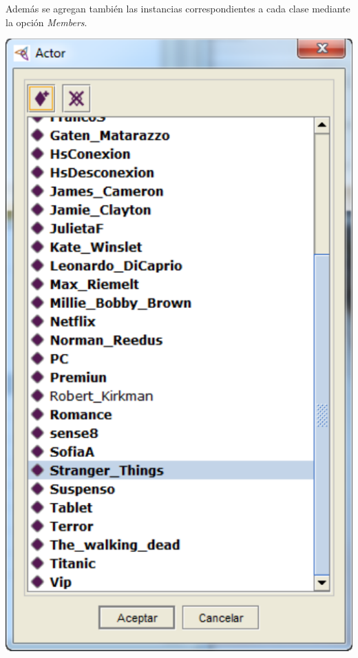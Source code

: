 \documentclass[a4paper,10pt,spanish,oneside]{article}
\begin{document}
\begin{minipage}{0.3\linewidth}

Además se agregan también las instancias correspondientes a cada clase mediante la opción \textit{Members}.

\end{minipage} \hfill \begin{minipage}{0.65\linewidth}

\begin{center}
\includegraphics[width=0.5\linewidth]{6}
\end{center}

\end{minipage}
\end{document}
